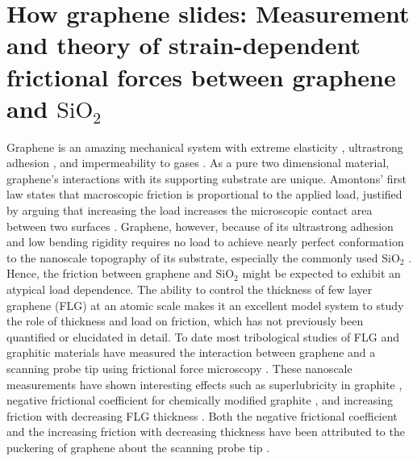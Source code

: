 \chapter{How graphene slides: Measurement and theory of strain-dependent frictional forces between graphene and $\mathrm{SiO_2}$\label{chap:fri}}

Graphene is an amazing mechanical system with extreme elasticity \cite{Lee2008}, ultrastrong adhesion \cite{Koenig2011}, and impermeability to gases \cite{Bunch2008}.
As a pure two dimensional material, graphene's interactions with its supporting substrate are unique.
Amontons' first law states that macroscopic friction is proportional to the applied load, justified by arguing that increasing the load increases the microscopic contact area between two surfaces \cite{Krim1996}.
Graphene, however, because of its ultrastrong adhesion \cite{Koenig2011} and low bending rigidity requires no load to achieve nearly perfect conformation to the nanoscale topography of its substrate, especially the commonly used $\mathrm{SiO_2}$ \cite{Stolyarova2007,Lui2009,Cullen2010}.
Hence, the friction between graphene and $\mathrm{SiO_2}$ might be expected to exhibit an atypical load dependence.
The ability to control the thickness of few layer graphene (FLG) at an atomic scale makes it an excellent model system to study the role of thickness and load on friction, which has not previously been quantified or elucidated in detail.
To date most tribological studies of FLG and graphitic materials have measured the interaction between graphene and a scanning probe tip using frictional force microscopy \cite{Dienwiebel2004,Deng2012,Lee2010,Li2010c,Filleter2009,Filleter2010,Zhang2012a}.
These nanoscale measurements have shown interesting effects such as superlubricity in graphite \cite{Dienwiebel2004}, negative frictional coefficient for chemically modified graphite \cite{Deng2012}, and increasing friction with decreasing FLG thickness \cite{Lee2010,Li2010c,Filleter2009,Filleter2010}.
Both the negative frictional coefficient and the increasing friction with decreasing thickness have been attributed to the puckering of graphene about the scanning probe tip \cite{Lee2010,Li2010c,Deng2012}.

